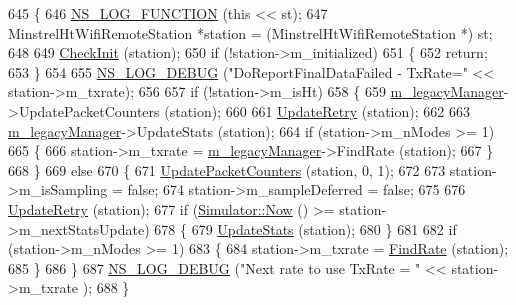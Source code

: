 \begin{DoxyCode}
645 \{
646   \hyperlink{log-macros-disabled_8h_a90b90d5bad1f39cb1b64923ea94c0761}{NS\_LOG\_FUNCTION} (\textcolor{keyword}{this} << st);
647   MinstrelHtWifiRemoteStation *station = (MinstrelHtWifiRemoteStation *) st;
648 
649   \hyperlink{classns3_1_1MinstrelHtWifiManager_a7f94804a34efa6121bdfd5d01ac34694}{CheckInit} (station);
650   \textcolor{keywordflow}{if} (!station->m\_initialized)
651     \{
652       \textcolor{keywordflow}{return};
653     \}
654 
655   \hyperlink{group__logging_ga413f1886406d49f59a6a0a89b77b4d0a}{NS\_LOG\_DEBUG} (\textcolor{stringliteral}{"DoReportFinalDataFailed - TxRate="} << station->m\_txrate);
656 
657   \textcolor{keywordflow}{if} (!station->m\_isHt)
658     \{
659       \hyperlink{classns3_1_1MinstrelHtWifiManager_ae10ffd948e46a60593b1aef80372082a}{m\_legacyManager}->UpdatePacketCounters (station);
660 
661       \hyperlink{classns3_1_1MinstrelHtWifiManager_a861e370c15601dd71c5bf79cd048b4e4}{UpdateRetry} (station);
662 
663       \hyperlink{classns3_1_1MinstrelHtWifiManager_ae10ffd948e46a60593b1aef80372082a}{m\_legacyManager}->UpdateStats (station);
664       \textcolor{keywordflow}{if} (station->m\_nModes >= 1)
665         \{
666           station->m\_txrate = \hyperlink{classns3_1_1MinstrelHtWifiManager_ae10ffd948e46a60593b1aef80372082a}{m\_legacyManager}->FindRate (station);
667         \}
668     \}
669   \textcolor{keywordflow}{else}
670     \{
671       \hyperlink{classns3_1_1MinstrelHtWifiManager_a7a73ce35e212586453fb9405c55654a5}{UpdatePacketCounters} (station, 0, 1);
672 
673       station->m\_isSampling = \textcolor{keyword}{false};
674       station->m\_sampleDeferred = \textcolor{keyword}{false};
675 
676       \hyperlink{classns3_1_1MinstrelHtWifiManager_a861e370c15601dd71c5bf79cd048b4e4}{UpdateRetry} (station);
677       \textcolor{keywordflow}{if} (\hyperlink{classns3_1_1Simulator_ac3178fa975b419f7875e7105be122800}{Simulator::Now} () >=  station->m\_nextStatsUpdate)
678         \{
679           \hyperlink{classns3_1_1MinstrelHtWifiManager_add9ba12485354ddfaae5a68a90469a92}{UpdateStats} (station);
680         \}
681 
682       \textcolor{keywordflow}{if} (station->m\_nModes >= 1)
683         \{
684           station->m\_txrate = \hyperlink{classns3_1_1MinstrelHtWifiManager_a06c5d6ae62e898a226ffd6cb0b448038}{FindRate} (station);
685         \}
686     \}
687   \hyperlink{group__logging_ga413f1886406d49f59a6a0a89b77b4d0a}{NS\_LOG\_DEBUG} (\textcolor{stringliteral}{"Next rate to use TxRate = "} << station->m\_txrate  );
688 \}
\end{DoxyCode}


